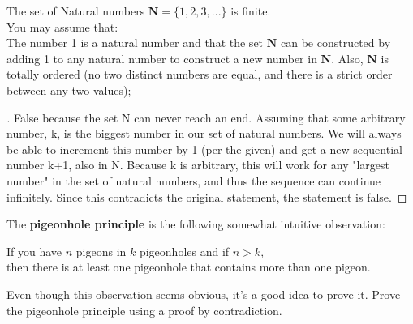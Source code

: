 \documentclass[12pt]{article}
\newenvironment{exercise}[2][Exercise]{\begin{trivlist}
\item[\hskip \labelsep {\bfseries #1}\hskip \labelsep {\bfseries #2.}]}{\end{trivlist}}
\newenvironment{solution}[1][{\color{red} Solution:}]{\begin{trivlist}
\item[\hskip \labelsep {\bfseries #1}\hskip \labelsep {\bfseries}]}{\end{trivlist}}
\begin{document}
\begin{exercise}{2}
\begin{enumerate}[(a)]
     \item The set of Natural numbers $\mathbf{N}=\{1,2,3,...\} $ is finite.
     \\
     You may assume that:\\
        The number 1 is a natural number and that
        the set $\mathbf{N}$ can be constructed by adding 1 to any natural number to construct a new number in $\mathbf{N}$. Also, $\mathbf{N}$ is totally ordered (no two distinct numbers are equal, and there is a strict order between any two values);
    \begin{solution} 
        \begin{proof}[\unskip\nopunct]
            False because the set N can never reach an end. Assuming that some arbitrary number, k, is the biggest number in our set of natural numbers. We will always be able to increment this number by 1 (per the given) and get a new sequential number k+1, also in N. Because k  is arbitrary, this will work for any "largest number" in the set of natural numbers, and thus the sequence can continue infinitely. Since this contradicts the original statement, the statement is false. 
        \end{proof}
    \end{solution}   
    
	\end{enumerate}
\end{exercise}

\clearpage

\begin{exercise}{3}

    The \textbf{pigeonhole principle} is the following somewhat intuitive observation: 
    \begin{center}
    If you have $n$ pigeons in $k$ pigeonholes and if $n>k$,\\then there is at least one pigeonhole that contains more than one pigeon.
    \end{center}
    Even though this observation seems obvious, it's a good idea to prove it. Prove the pigeonhole principle using a proof by contradiction.
        
\end{exercise}
\end{document}
